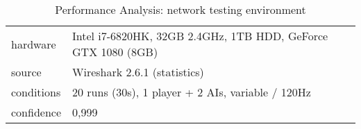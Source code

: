 \begin{table}[!ht]
	\centering
    \begin{tabular}{l|l}
        hardware & Intel i7-6820HK, 32GB 2.4GHz, 1TB HDD, GeForce GTX 1080 (8GB) \\
		source & Wireshark 2.6.1 (statistics) \\
		conditions & 20 runs (30s), 1 player + 2 AIs, variable / 120Hz \\
		confidence & 0,999 \\
    \end{tabular}

    \caption{Performance Analysis: network testing environment}\label{tb:performance:network}
\end{table}
